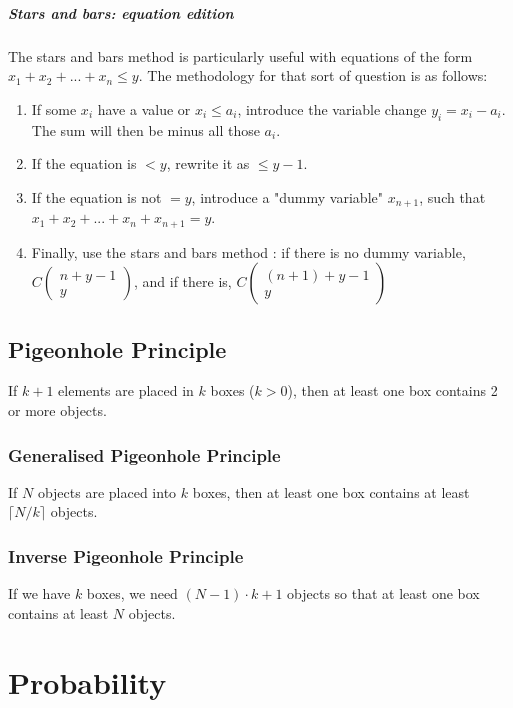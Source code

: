 \documentclass[10pt,a4paper]{book}
\begin{document}
\paragraph*{Stars and bars: equation edition}
The stars and bars method is particularly useful with equations of the form $x_1+x_2+...+x_n\leq y$. The methodology for that sort of question is as follows:
\begin{enumerate}[nosep]
\item If some $x_i$ have a value or $x_i\leq a_i$, introduce the variable change $y_i = x_i-a_i$. The sum will then be minus all those $a_i$.
\item If the equation is $<y$, rewrite it as $\leq y-1$.
\item If the equation is not $=y$, introduce a "dummy variable" $x_{n+1}$, such that $x_1+x_2+...+x_n+x_{n+1}=y$.
\item Finally, use the stars and bars method : if there is no dummy variable, $C\begin{pmatrix}n+y-1\\y\end{pmatrix}$, and if there is, $C\begin{pmatrix}(n+1)+y-1\\y\end{pmatrix}$
\end{enumerate}
\section{Pigeonhole Principle}
If $k+1$ elements are placed in $k$ boxes ($k>0$), then at least one box contains 2 or more objects.
\subsection{Generalised Pigeonhole Principle}
If $N$ objects are placed into $k$ boxes, then at least one box contains at least $\lceil N/k\rceil$ objects.
\subsection{Inverse Pigeonhole Principle}
If we have $k$ boxes, we need $(N-1)\cdot k+1$ objects so that at least one box contains at least $N$ objects.

\chapter{Probability}
\end{document}
